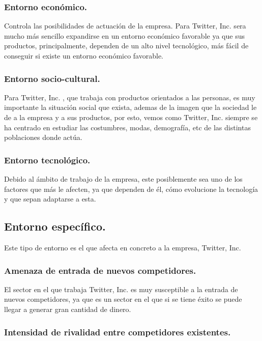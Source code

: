 \subsubsection{Entorno económico.}

Controla las posibilidades de actuación de la empresa. Para Twitter, Inc. sera mucho más sencillo expandirse en un entorno económico favorable ya que sus productos, principalmente, dependen de un alto nivel tecnológico, más fácil de conseguir si existe un entorno económico favorable.

\subsubsection{Entorno socio-cultural.}

Para Twitter, Inc. , que trabaja con productos orientados a las personas, es muy importante la situación social que exista, ademas de la imagen que la sociedad le de a la empresa y a sus productos, por esto, vemos como Twitter, Inc. siempre se ha centrado en estudiar las costumbres, modas, demografía, etc de las distintas poblaciones donde actúa.

\subsubsection{Entorno tecnológico.}

Debido al ámbito de trabajo de la empresa, este posiblemente sea uno de los factores que más le afecten, ya que dependen de él, cómo evolucione la tecnología y que sepan adaptarse a esta.


\subsection{Entorno específico.}

Este tipo de entorno es el que afecta en concreto a la empresa, Twitter, Inc.

\subsubsection{Amenaza de entrada de nuevos competidores.}

El sector en el que trabaja Twitter, Inc. es muy susceptible a la entrada de nuevos competidores, ya que es un sector en el que si se tiene éxito se puede llegar a generar gran cantidad de dinero.

\subsubsection{Intensidad de rivalidad entre competidores existentes.}

